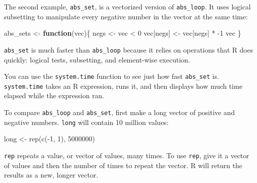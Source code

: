 \documentclass[
  letterpaper,
  DIV=11,
  numbers=noendperiod]{scrbook}
\newenvironment{Shaded}{\begin{snugshade}}{\end{snugshade}}
\newcommand{\ControlFlowTok}[1]{\textcolor[rgb]{0.00,0.23,0.31}{\textbf{#1}}}
\newcommand{\DecValTok}[1]{\textcolor[rgb]{0.68,0.00,0.00}{#1}}
\newcommand{\FunctionTok}[1]{\textcolor[rgb]{0.28,0.35,0.67}{#1}}
\newcommand{\NormalTok}[1]{\textcolor[rgb]{0.00,0.23,0.31}{#1}}
\newcommand{\OtherTok}[1]{\textcolor[rgb]{0.00,0.23,0.31}{#1}}
\newcommand{\SpecialCharTok}[1]{\textcolor[rgb]{0.37,0.37,0.37}{#1}}
\begin{document}
The second example, \texttt{abs\_set}, is a vectorized version of
\texttt{abs\_loop}. It uses logical subsetting to manipulate every
negative number in the vector at the same time:

\begin{Shaded}
\begin{Highlighting}[]
\NormalTok{abs\_sets }\OtherTok{\textless{}{-}} \ControlFlowTok{function}\NormalTok{(vec)\{}
\NormalTok{  negs }\OtherTok{\textless{}{-}}\NormalTok{ vec }\SpecialCharTok{\textless{}} \DecValTok{0}
\NormalTok{  vec[negs] }\OtherTok{\textless{}{-}}\NormalTok{ vec[negs] }\SpecialCharTok{*} \SpecialCharTok{{-}}\DecValTok{1}
\NormalTok{  vec}
\NormalTok{\}}
\end{Highlighting}
\end{Shaded}

\texttt{abs\_set} is much faster than \texttt{abs\_loop} because it
relies on operations that R does quickly: logical tests, subsetting, and
element-wise execution.

You can use the \texttt{system.time} function to see just how fast
\texttt{abs\_set} is. \texttt{system.time} takes an R expression, runs
it, and then displays how much time elapsed while the expression ran.

To compare \texttt{abs\_loop} and \texttt{abs\_set}, first make a long
vector of positive and negative numbers. \texttt{long} will contain 10
million values:

\begin{Shaded}
\begin{Highlighting}[]
\NormalTok{long }\OtherTok{\textless{}{-}} \FunctionTok{rep}\NormalTok{(}\FunctionTok{c}\NormalTok{(}\SpecialCharTok{{-}}\DecValTok{1}\NormalTok{, }\DecValTok{1}\NormalTok{), }\DecValTok{5000000}\NormalTok{)}
\end{Highlighting}
\end{Shaded}

\begin{tcolorbox}[enhanced jigsaw, breakable, colback=white, colbacktitle=quarto-callout-note-color!10!white, arc=.35mm, bottomrule=.15mm, coltitle=black, left=2mm, rightrule=.15mm, colframe=quarto-callout-note-color-frame, leftrule=.75mm, opacitybacktitle=0.6, bottomtitle=1mm, toptitle=1mm, titlerule=0mm, opacityback=0, title=\textcolor{quarto-callout-note-color}{\faInfo}\hspace{0.5em}{Note}, toprule=.15mm]

\texttt{rep} repeats a value, or vector of values, many times. To use
\texttt{rep}, give it a vector of values and then the number of times to
repeat the vector. R will return the results as a new, longer vector.

\end{tcolorbox}
\end{document}
